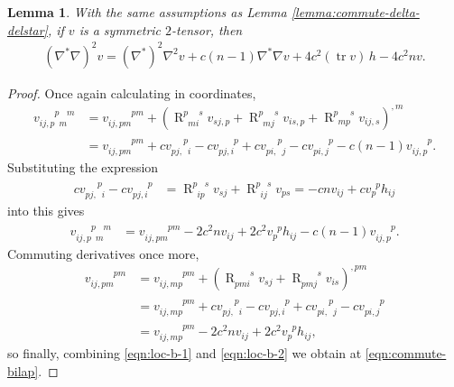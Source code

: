 \documentclass[10pt,reqno]{amsart}
\newtheorem{lemma}[theorem]{Lemma}
\DeclareMathOperator{\tr}{tr}
\DeclareMathOperator{\R}{R}
\newcommand{\riem}{\R}
\newcommand{\riemdddu}[4]{\riem^{\phantom{#1 #2 #3} #4}_{#1 #2 #3}}
\newcommand{\riemuddu}[4]{\riem^{#1 \phantom{#2 #3} #4}_{\phantom{#1} #2 #3 \phantom{#4}}}
\newcommand{\vdd}[2]{v_{#1 #2}}
\newcommand{\vdu}[2]{v_{#1}^{\phantom{#1} #2}}
\newcommand{\vdddu}[4]{v_{#1 #2, #3}^{\phantom{#1#2,#3} #4}}
\newcommand{\vddud}[4]{v_{#1 #2, \phantom{#3} #4}^{\phantom{#1#2,} #3 \phantom{#4}}}
\newcommand{\vdddudu}[6]{v_{#1#2,#3\phantom{#4}#5\phantom{#6}}^{\phantom{#1#2,#3}#4\phantom{#5}#6}}
\begin{document}
\begin{lemma} With the same assumptions as Lemma \ref{lemma:commute-delta-delstar}, if $v$ is a symmetric $2$-tensor, then
\begin{align} \label{eqn:commute-bilap}
(\nabla^* \nabla)^2 v = (\nabla^*)^2\nabla^2 v + c(n-1) \nabla^* \nabla v  + 4c^2 (\tr v)\, h - 4c^2 n v.
\end{align}
\end{lemma}
\begin{proof}
Once again calculating in coordinates, 
\begin{align*}
\vdddudu{i}{j}{p}{p}{m}{m} &= \vdddu{i}{j}{pm}{pm} + ( \riemuddu{p}{m}{i}{s} v_{sj,p} + \riemuddu{p}{m}{j}{s} v_{is,p} + \riemuddu{p}{m}{p}{s} v_{ij,s} )^{,m} \nonumber \\
&= \vdddu{i}{j}{pm}{pm} + c \vddud{p}{j}{p}{i} - c \vdddu{p}{j}{i}{p} + c \vddud{p}{i}{p}{j} - c \vdddu{p}{i}{j}{p} - c(n-1) \vdddu{i}{j}{p}{p}. 
\end{align*}
Substituting the expression
\begin{align*}
c \vddud{p}{j}{p}{i} - c \vdddu{p}{j}{i}{p} &= \riemuddu{p}{i}{p}{s} v_{sj} + \riemuddu{p}{i}{j}{s} v_{ps} = -c n v_{ij} + c \vdu{p}{p} h_{ij}
\end{align*}
into this gives 
\begin{align} \label{eqn:loc-b-1}
\vdddudu{i}{j}{p}{p}{m}{m} &=\vdddu{i}{j}{pm}{pm} -2 c^2 n v_{ij} + 2 c^2 \vdu{p}{p} h_{ij} - c(n-1) \vdddu{i}{j}{p}{p}. 
\end{align}
Commuting derivatives once more,
\begin{align} \label{eqn:loc-b-2}
\vdddu{i}{j}{pm}{pm} &= \vdddu{i}{j}{mp}{pm} + ( \riemdddu{p}{m}{i}{s} \vdd{s}{j} + \riemdddu{p}{m}{j}{s} \vdd{i}{s} )^{,pm} \nonumber \\
&= \vdddu{i}{j}{mp}{pm} + c \vddud{p}{j}{p}{i} - c \vdddu{p}{j}{i}{p} + c \vddud{p}{i}{p}{j} - c \vdddu{p}{i}{j}{p} \nonumber \\
&= \vdddu{i}{j}{mp}{pm} -2 c^2 n v_{ij} + 2 c^2 \vdu{p}{p} h_{ij},
\end{align}
so finally, combining \eqref{eqn:loc-b-1} and \eqref{eqn:loc-b-2} we obtain at \eqref{eqn:commute-bilap}.
\end{proof}
\end{document}
